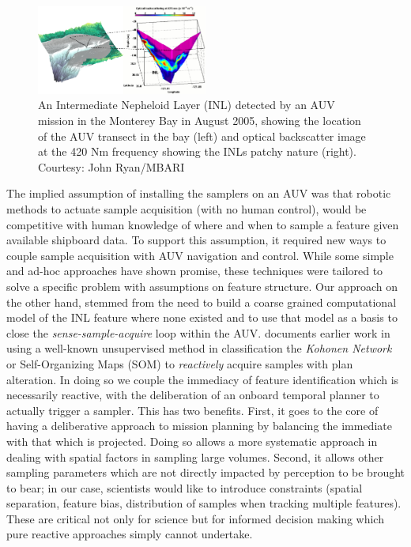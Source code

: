 \begin{figure}[htpb]
\centering
\includegraphics[width=0.5\textwidth]{figs/inl.jpg}
\caption{\small An Intermediate Nepheloid Layer (INL) detected by an
  AUV mission in the Monterey Bay in August 2005, showing the location
  of the AUV transect in the bay (left) and optical backscatter image
  at the 420 Nm frequency showing the INLs patchy nature
  (right). \small{Courtesy: John Ryan/MBARI}}
\label{fig:inl}
\end{figure}

The implied assumption of installing the samplers on an AUV was that
robotic methods to actuate sample acquisition (with no human control),
would be competitive with human knowledge of where and when to sample
a feature given available shipboard data. To support this assumption,
it required new ways to couple sample acquisition with AUV navigation
and control. While some simple and ad-hoc approaches \cite{yanwu10,
  yanwu11} have shown promise, these techniques were tailored to solve
a specific problem with assumptions on feature structure.  Our
approach on the other hand, stemmed from the need to build a coarse
grained computational model of the INL feature where none existed and
to use that model as a basis to close the \emph{sense-sample-acquire}
loop within the AUV. \cite{fox2007} documents earlier work in using a
well-known unsupervised method in classification the \emph{Kohonen
  Network} or Self-Organizing Maps (SOM) \cite{kohonen} to
\emph{reactively} acquire samples with plan alteration. In doing so we
couple the immediacy of feature identification which is necessarily
reactive, with the deliberation of an onboard temporal planner to
actually trigger a sampler. This has two benefits. First, it goes to
the core of having a deliberative approach to mission planning by
balancing the immediate with that which is projected. Doing so allows
a more systematic approach in dealing with spatial factors in sampling
large volumes. Second, it allows other sampling parameters which are
not directly impacted by perception to be brought to bear; in our
case, scientists would like to introduce constraints (spatial
separation, feature bias, distribution of samples when tracking
multiple features). These are critical not only for science but for
informed decision making which pure reactive approaches simply cannot
undertake.

